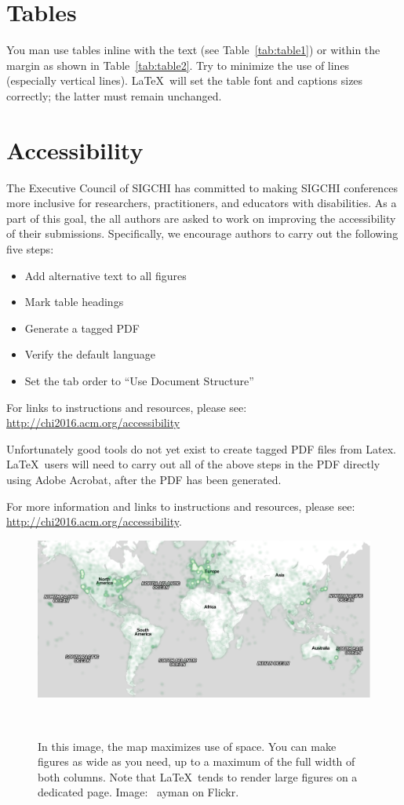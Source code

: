 \documentclass{sigchi-ext}
\begin{document}
\section{Tables}
You man use tables inline with the text (see Table~\ref{tab:table1})
or within the margin as shown in Table~\ref{tab:table2}. Try to
minimize the use of lines (especially vertical lines). \LaTeX\ will
set the table font and captions sizes correctly; the latter must
remain unchanged.

\section{Accessibility}
The Executive Council of SIGCHI has committed to making SIGCHI
conferences more inclusive for researchers, practitioners, and
educators with disabilities. As a part of this goal, the all authors
are asked to work on improving the accessibility of their
submissions. Specifically, we encourage authors to carry out the
following five steps:
\begin{itemize}\compresslist%
\item Add alternative text to all figures
\item Mark table headings
\item Generate a tagged PDF
\item Verify the default language
\item Set the tab order to ``Use Document Structure''
\end{itemize}

For links to instructions and resources, please see:
\url{http://chi2016.acm.org/accessibility}

Unfortunately good tools do not yet exist to create tagged PDF files
from Latex. \LaTeX\ users will need to carry out all of the above
steps in the PDF directly using Adobe Acrobat, after the PDF has been
generated.

For more information and links to instructions and resources, please
see:
\url{http://chi2016.acm.org/accessibility}.

\begin{figure}
  \centering
  \includegraphics[width=1.3\columnwidth]{figures/map}
  \caption{In this image, the map maximizes use of space. You can make
    figures as wide as you need, up to a maximum of the full width of
    both columns. Note that \LaTeX\ tends to render large figures on a
    dedicated page. Image: \ccbynd~ayman on Flickr.}~\label{fig:cats}
\end{figure}
\end{document}
